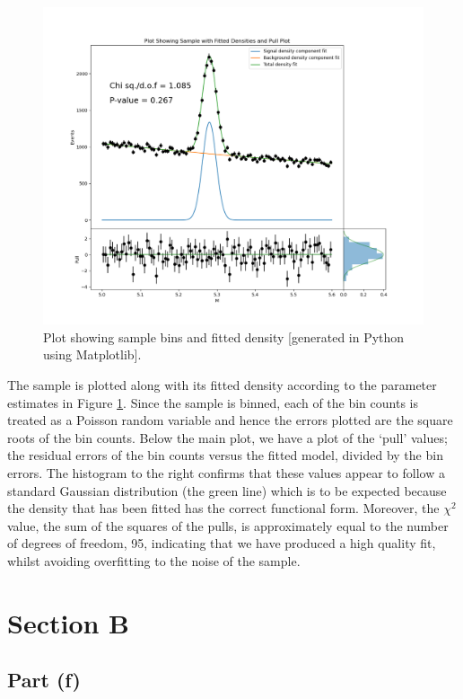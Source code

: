 \documentclass[12pt]{article}
\begin{document}
\begin{figure}[htb]
  \includegraphics[scale=0.45]{part_e_plot.png}
  \caption{Plot showing sample bins and fitted density [generated in Python using Matplotlib].}
  \label{part_e_plot}
\end{figure}

The sample is plotted along with its fitted density according to the parameter estimates in Figure \ref{part_e_plot}.
Since the sample is binned, each of the bin counts is treated as a Poisson random variable and hence the errors plotted are the square roots of the bin counts.
Below the main plot, we have a plot of the `pull' values; the residual errors of the bin counts versus the fitted model, divided by the bin errors.
The histogram to the right confirms that these values appear to follow a standard Gaussian distribution (the green line) which is to be expected because the density that has been fitted has the correct functional form.
Moreover, the $\chi^2$ value, the sum of the squares of the pulls, is approximately equal to the number of degrees of freedom, 95, indicating that we have produced a high quality fit, whilst avoiding overfitting to the noise of the sample.

\section*{Section B}
\subsection*{Part (f)}
\end{document}
